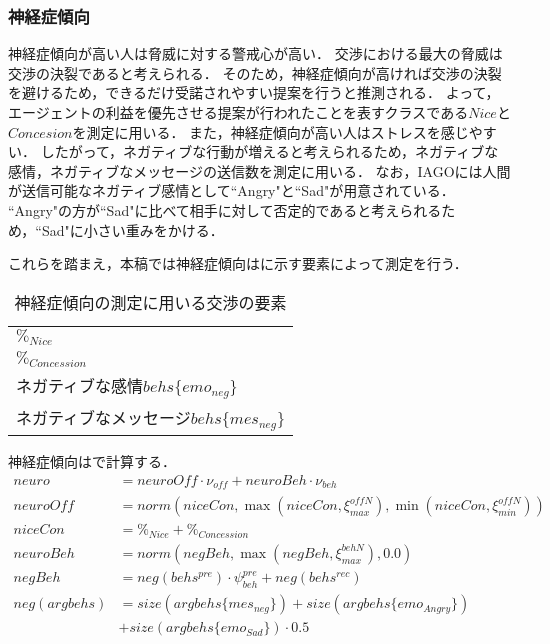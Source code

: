 \subsubsection{神経症傾向}
神経症傾向が高い人は脅威に対する警戒心が高い．
交渉における最大の脅威は交渉の決裂であると考えられる．
そのため，神経症傾向が高ければ交渉の決裂を避けるため，できるだけ受諾されやすい提案を行うと推測される．
よって，エージェントの利益を優先させる提案が行われたことを表すクラスである$Nice$と$Concesion$を測定に用いる．
また，神経症傾向が高い人はストレスを感じやすい．
したがって，ネガティブな行動が増えると考えられるため，ネガティブな感情，ネガティブなメッセージの送信数を測定に用いる．
なお，IAGOには人間が送信可能なネガティブ感情として“Angry"と“Sad"が用意されている．
“Angry"の方が“Sad"に比べて相手に対して否定的であると考えられるため，“Sad"に小さい重みをかける．

これらを踏まえ，本稿では神経症傾向はに示す要素によって測定を行う．

\begin{table}[tb]
    \centering
    \caption{神経症傾向の測定に用いる交渉の要素}
    \begin{tabular}{l} \toprule
        $\%_{Nice}$ \\
        $\%_{Concession}$ \\
        ネガティブな感情$behs\{emo_{neg}\}$ \\
        ネガティブなメッセージ$behs\{mes_{neg}\}$ \\ \bottomrule
    \end{tabular}
    \label{tab:neuroticism}
\end{table}

神経症傾向はで計算する．
\begin{align}
    neuro &= \mathit{neuroOff} \cdot \nu_{\mathit{off}} + neuroBeh \cdot \nu_{beh} \label{eq:neuroticism} \\
    \mathit{neuroOff} &= norm\left(niceCon, \max \left( niceCon, \xi_{max}^{\mathit{offN}}\right) , \min \left(niceCon, \xi_{min}^{\mathit{offN}}\right) \right) \nonumber \\
    niceCon &= \%_{Nice} + \%_{Concession} \nonumber \\
    neuroBeh &= norm\left( negBeh, \max \left( negBeh, \xi_{max}^{\mathit{behN}}\right), 0.0 \right) \nonumber \\
    negBeh &=  neg(behs^{pre}) \cdot \psi_{beh}^{pre} + neg(behs^{rec}) \nonumber \\
    neg(argbehs) &= size(argbehs\{mes_{neg}\}) + size(argbehs\{emo_{Angry}\}) \nonumber \\
    &+ size(argbehs\{emo_{Sad}\}) \cdot 0.5 \nonumber 
\end{align}


